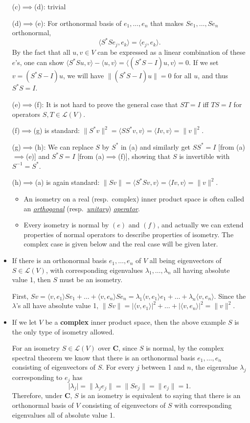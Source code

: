 \documentclass[11pt]{article}
\newcommand{\df}[1]{\ul{\textit{\textsf{#1}}}}
\newcommand{\C}{\mathbf{C}}
\newcommand{\inp}[2]{\langle #1, #2 \rangle}
\newcommand{\nm}[1]{\|#1\|}
\newcommand{\abs}[1]{\lvert #1 \rvert}
\newcommand{\LV}{\mathcal{L}(V)}
\begin{document}
\begin{itemize}
    (c)$\implies$(d): trivial
    
    (d)$\implies$(e): For orthonormal basis of $e_1,\dots,e_n$ that makes $Se_1,\dots,Se_n$ orthonormal, $$\inp{S^*Se_j}{e_k}=\inp{e_j}{e_k}.$$ By the fact that all $u,v \in V$ can be expressed as a linear combination of these $e$'s, one can show $\inp{S^*Su}{v}-\inp{u}{v} = \inp{(S^*S-I)u}{v} = 0$. If we set $v = (S^*S-I)u$, we will have $\nm{(S^*S-I)u}=0$ for all $u$, and thus $S^*S=I$.
    
    (e)$\implies$(f): It is not hard to prove the general case that $ST = I$ iff $TS =I$ for operators $S,T \in \LV$.
    
    (f)$\implies$(g) is standard: $\nm{S^*v}^2=\inp{SS^*v}{v} = \inp{Iv}{v} = \nm{v}^2$.
    
    (g)$\implies$(h): We can replace $S$ by $S^*$ in (a) and similarly get $SS^*=I$ [from (a)$\implies$(e)] and $S^*S=I$ [from (a)$\implies$(f)], showing that $S$ is invertible with $S^{-1}=S^*$.
    
    (h)$\implies$(a) is again standard: $\nm{Sv} = \inp{S^*Sv}{v} = \inp{Iv}{v} = \nm{v}^2$.
    \begin{itemize}
        \item An isometry on a real (resp.\ complex) inner product space is often called an \df{orthogonal} (resp.\ \df{unitary}) \df{operator}.
        \item Every isometry is normal by $(e)$ and $(f)$, and actually we can extend properties of normal operators to describe properties of isometry. The complex case is given below and the real case will be given later.
    \end{itemize}
    \item If there is an orthonormal basis $e_1,\dots,e_n$ of $V$ all being eigenvectors of $S \in \LV$, with corresponding eigenvalues $\lambda_1,\dots,\lambda_n$ all having absolute value 1, then $S$ must be an isometry.
    
    First, $Sv = \inp{v}{e_1}Se_1 + \dots + \inp{v}{e_n}Se_n = \lambda_1\inp{v}{e_1}e_1 + \dots + \lambda_n\inp{v}{e_n}$. Since the $\lambda$'s all have absolute value 1, $\nm{Sv} = \abs{\inp{v}{e_1}}^2 + \dots + \abs{\inp{v}{e_n}}^2 = \nm{v}^2$.
    \item If we let $V$ be a \textbf{complex} inner product space, then the above example $S$ is the only type of isometry allowed.
    
    For an isometry $S \in \LV$ over $\C$, since $S$ is normal, by the complex spectral theorem we know that there is an orthonormal basis $e_1,\dots,e_n$ consisting of eigenvectors of $S$. For every $j$ between 1 and $n$, the eigenvalue $\lambda_j$ corresponding to $e_j$ has \[\abs{\lambda_j}=\nm{\lambda_je_j}=\nm{Se_j}=\nm{e_j}=1.\]
    Therefore, under $\C$, $S$ is an isometry is equivalent to saying that there is an orthonormal basis of $V$ consisting of eigenvectors of $S$ with corresponding eigenvalues all of absolute value 1.
\end{itemize}
\end{document}
